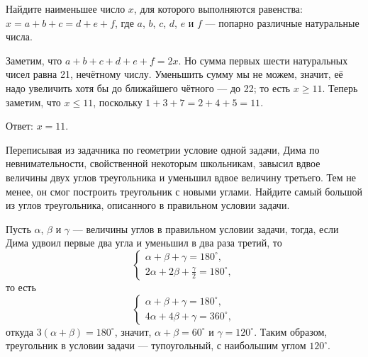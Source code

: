 
\begin{itemize}
\itC Найдите наименьшее число $x$, для которого выполняются равенства:
$x = a+b+c = d+e+f$, где $a$, $b$, $c$, $d$, $e$ и $f$ --- попарно различные натуральные числа.

\itr Заметим, что $a+b+c+d+e+f=2x$. Но сумма первых шести натуральных чисел равна 21, нечётному числу.
Уменьшить сумму мы не можем, значит, её надо увеличить хотя бы до ближайшего чётного --- до 22;
то есть $x \ge 11$. Теперь заметим, что $x \le 11$, поскольку
$1 + 3 +7 = 2 + 4 + 5 = 11$.

Ответ: $x=11$.
\end{itemize}

\begin{itemize}
\itB Переписывая из задачника по геометрии условие одной задачи, Дима по невнимательности, 
свойственной некоторым школьникам, завысил вдвое величины двух углов треугольника и уменьшил 
вдвое величину третьего. Тем не менее, он смог построить треугольник с новыми углами. Найдите 
самый большой из углов треугольника, описанного в правильном условии задачи.

\itr
 Пусть $\alpha$, $\beta$ и $\gamma$ --- величины углов в правильном условии задачи, тогда, если 
Дима удвоил первые два угла и уменьшил в два раза третий, то
$$
\begin{cases}
\alpha+\beta+\gamma=180^{\circ},\\
2\alpha+2\beta+\frac{\gamma}{2}=180^{\circ},
\end{cases}
$$
то есть
$$
\begin{cases}
\alpha+\beta+\gamma=180^{\circ},\\
4\alpha+4\beta+\gamma=360^{\circ},
\end{cases}
$$
откуда $3(\alpha+\beta)=180^{\circ}$, значит, $\alpha+\beta=60^\circ$ и $\gamma=120^{\circ}$.
Таким образом, треугольник в условии задачи --- тупоугольный, с наибольшим углом 
$120^{\circ}$.

\end{itemize}
